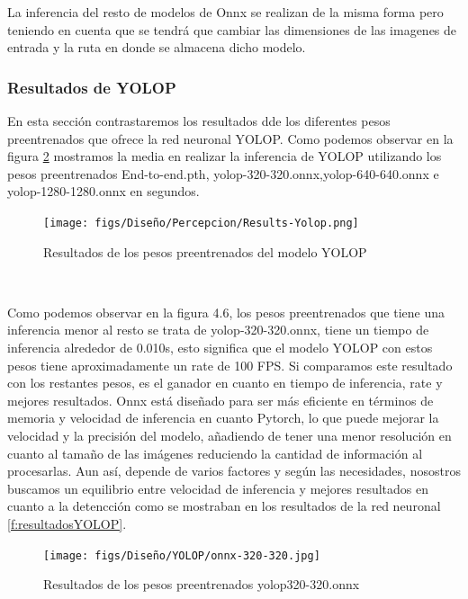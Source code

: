         La inferencia del resto de modelos de Onnx se realizan de la misma forma pero teniendo en cuenta que se tendrá que cambiar las dimensiones de las imagenes de entrada y la ruta
        en donde se almacena dicho modelo. 


\subsubsection{Resultados de YOLOP }
\label{sec:resultados}
En esta sección contrastaremos los resultados dde los diferentes pesos preentrenados que ofrece la red neuronal YOLOP. Como podemos observar en la figura \ref{fig:pesos_preentrenados} 
mostramos la media en realizar la inferencia de YOLOP utilizando los pesos preentrenados End-to-end.pth, yolop-320-320.onnx,yolop-640-640.onnx e yolop-1280-1280.onnx en segundos.

\begin{figure} [H]
  \begin{center}
    \texttt{[image: figs/Diseño/Percepcion/Results-Yolop.png]}
  \end{center}
  \caption{Resultados de los pesos preentrenados del modelo YOLOP}
  \label{fig:pesos_preentrenados}
\end{figure}\

Como podemos observar en la figura 4.6, los pesos preentrenados que tiene una inferencia menor al resto se trata de yolop-320-320.onnx, tiene un tiempo de inferencia alrededor de 0.010s, esto
significa que el modelo YOLOP con estos pesos tiene aproximadamente un rate de 100 FPS. Si comparamos este resultado con los restantes pesos, es el ganador en cuanto 
en tiempo de inferencia, rate y mejores resultados. 
Onnx está diseñado para ser más eficiente en términos de memoria y velocidad de inferencia en cuanto Pytorch, lo que puede mejorar la velocidad y la precisión
del modelo, añadiendo de tener una menor resolución en cuanto al tamaño de las imágenes reduciendo la cantidad de información al procesarlas. Aun así, depende de varios factores y según las necesidades, nosostros
buscamos un equilibrio entre velocidad de inferencia y mejores resultados en cuanto a la detencción como se mostraban en los resultados de la red neuronal \ref{f:resultadosYOLOP}. \newline

\begin{figure} [H]
  \begin{center}
    \texttt{[image: figs/Diseño/YOLOP/onnx-320-320.jpg]}
  \end{center}
  \caption{Resultados de los pesos preentrenados yolop320-320.onnx}
  \label{fig:pesos_preentrenados}
\end{figure}\

